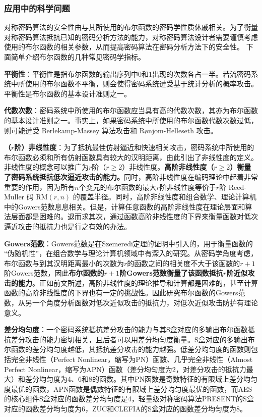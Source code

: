 \documentclass[a4paper,zihao=-4,AutoFakeBold]{ctexart}
\begin{document}
\subsubsection{应用中的科学问题}
对称密码算法的安全性由与其所使用的布尔函数的密码学性质休戚相关。为了衡量对称密码算法抵抗已知的密码分析方法的能力，对称密码算法设计者需要谨慎考虑使用的布尔函数的相关参数，从而提高密码算法在密码分析方法下的安全性。
下面简单介绍布尔函数的几种常见密码学指标。

\textbf{平衡性}：平衡性是指布尔函数的输出序列中$0$和$1$出现的次数各占一半。若流密码系统中所使用的布尔函数不平衡，则会使得密码系统遭受基于统计分析的概率攻击。平衡性是布尔函数的基本设计准则之一。

\textbf{代数次数}：密码系统中所使用的布尔函数应当具有高的代数次数，其亦为布尔函数的基本设计准则之一。事实上，如果密码系统中所使用的布尔函数代数次数过低，则可能遭受 Berlekamp-Massey 算法攻击和 Rønjom-Helleseth 攻击。

\textbf{（$r$阶）非线性度}：为了抵抗最佳仿射逼近和快速相关攻击，密码系统中所使用的布尔函数必须和所有仿射函数具有较大的汉明距离，由此引出了非线性度的定义。非线性度的概念可以推广为$r$阶（$r\ge 2$）非线性度。\textbf{高阶非线性度（$r\ge 2$）衡量了密码系统抵抗低次逼近攻击的能力。}同时，高阶非线性度在编码理论中起着非常重要的作用，因为所有$n$个变元的布尔函数的最大$r$阶非线性度等价于$r$阶 Reed-Muller 码 $\mathrm{RM}(r, n)$ 的覆盖半径。同时，高阶非线性度和组合数学、理论计算机中的Gowers范数息息相关。但是，计算任意函数的高阶非线性度在理论层面和算法层面都是困难的。退而求其次，通过函数高阶非线性度的下界来衡量函数对低次逼近攻击的抵抗力也是行之有效的办法。

\textbf{Gowers范数}：Gowers范数是在Szemeredi定理的证明中引入的，用于衡量函数的 ``伪随机性''，在组合数学与理论计算机领域中有深入的研究。从密码学角度考虑，布尔函数与到其汉明距离最小的次数为$r$的函数之间的相关度不大于该函数的$r+1$阶Gowers范数，因此\textbf{布尔函数的$r+1$阶Gowers范数衡量了该函数抵抗$r$阶近似攻击的能力}。正如前文所述，高阶非线性度的理论推导和计算都是困难的，甚至计算函数的高阶非线性度的下界也有一定的挑战性。因此研究布尔函数的Gowers范数，从另一个角度分析函数对低次近似攻击的抵抗力，对低次近似攻击防护有理论意义。

\textbf{差分均匀度}：一个密码系统抵抗差分攻击的能力与其S盒对应的多输出布尔函数抵抗差分攻击的能力密切相关，且后者可以用差分均匀度衡量。S盒对应的多输出布尔函数的差分均匀度越低，其抵抗差分攻击的能力越强。低差分均匀度的函数则包括完全非线性（Perfect Nonlinear，缩写为PN）函数、几乎完全非线性（Almost Perfect Nonlinear，缩写为APN）函数（差分均匀度为2，对差分攻击的抵抗力最大）和差分均匀度为4、6和8的函数。其中PN函数是奇数特征的有限域上差分均匀度最优的函数，APN函数是偶数特征的有限域上差分均匀度最优的函数，而AES的核心组件S盒对应的函数差分均匀度是4，轻量级对称密码算法PRESENT的S盒对应的函数差分均匀度为6，ZUC和CLEFIA的S盒对应的函数差分均匀度为8。
\end{document}
